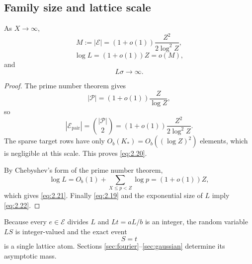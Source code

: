 \subsection{Family size and lattice scale}

\begin{lemma}\label{lem:family-size}
As $X\to\infty$,
\[
M:=|\mathcal E|
=(1+o(1))\frac{Z^2}{2\log^2Z},
\tag{2.20}\label{eq:2.20}
\]
\[
\log L=(1+o(1))Z=o(M),
\tag{2.21}\label{eq:2.21}
\]
and
\[
L\sigma\longrightarrow\infty.
\tag{2.22}\label{eq:2.22}
\]
\end{lemma}

\begin{proof}
The prime number theorem gives
\[
|\mathcal P|=(1+o(1))\frac{Z}{\log Z},
\]
so
\[
|\mathcal E_{\mathrm{pair}}|
=\binom{|\mathcal P|}{2}
=(1+o(1))\frac{Z^2}{2\log^2Z}.
\]
The sparse target rows have only $O_b(K_*)=O_b((\log Z)^2)$ elements, which is negligible at this scale. This proves \eqref{eq:2.20}.

By Chebyshev's form of the prime number theorem,
\[
\log L
=O_b(1)+\sum_{X\le p<Z}\log p
=(1+o(1))Z,
\]
which gives \eqref{eq:2.21}. Finally \eqref{eq:2.19} and the exponential size of $L$ imply \eqref{eq:2.22}.
\end{proof}

Because every $e\in\mathcal E$ divides $L$ and $Lt=aL/b$ is an integer, the random variable $LS$ is integer-valued and the exact event
\[
S=t
\tag{2.23}\label{eq:2.23}
\]
is a single lattice atom. Sections \ref{sec:fourier}--\ref{sec:gaussian} determine its asymptotic mass.